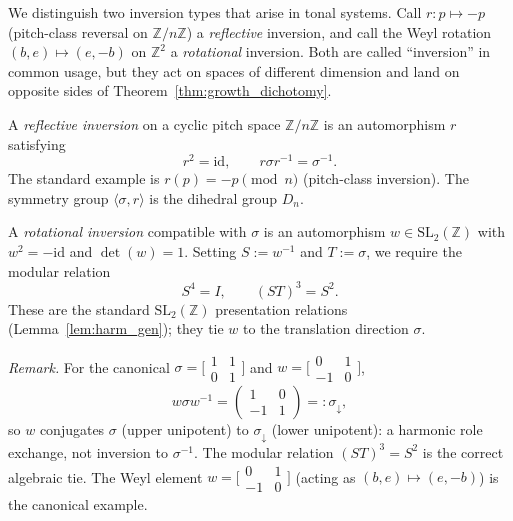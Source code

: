 We distinguish two inversion types that arise in tonal systems.
Call $r: p \mapsto -p$ (pitch-class reversal on $\mathbb{Z}/n\mathbb{Z}$) a
\emph{reflective} inversion, and call the Weyl rotation
$(b,e) \mapsto (e,-b)$ on $\mathbb{Z}^2$ a \emph{rotational} inversion.
Both are called ``inversion'' in common usage, but they act on spaces of
different dimension and land on opposite sides of
Theorem~\ref{thm:growth_dichotomy}.

\begin{definition}
  \label{def:refl_inv}
  A \emph{reflective inversion} on a cyclic pitch space $\mathbb{Z}/n\mathbb{Z}$
  is an automorphism $r$ satisfying
  \[
    r^2 = \mathrm{id}, \qquad r\sigma r^{-1} = \sigma^{-1}.
  \]
  The standard example is $r(p) = -p \pmod{n}$ (pitch-class inversion).
  The symmetry group $\langle \sigma, r \rangle$ is the dihedral group $D_n$.
\end{definition}

\begin{definition}
  \label{def:rot_inv}
  A \emph{rotational inversion} compatible with $\sigma$ is an automorphism
  $w \in \mathrm{SL}_2(\mathbb{Z})$ with $w^2 = -\mathrm{id}$ and $\det(w) = 1$.
  Setting $S := w^{-1}$ and $T := \sigma$, we require the modular relation
  \[
    S^4 = I, \qquad (ST)^3 = S^2.
  \]
  These are the standard $\mathrm{SL}_2(\mathbb{Z})$ presentation relations
  (Lemma~\ref{lem:harm_gen}); they tie $w$ to the translation direction $\sigma$.

  \emph{Remark.}  For the canonical $\sigma =
  \bigl[\begin{smallmatrix}1&1\\0&1\end{smallmatrix}\bigr]$ and
  $w = \bigl[\begin{smallmatrix}0&1\\-1&0\end{smallmatrix}\bigr]$,
  \[
    w\sigma w^{-1} = \begin{pmatrix}1&0\\-1&1\end{pmatrix} =: \sigma_{\downarrow},
  \]
  so $w$ conjugates $\sigma$ (upper unipotent) to $\sigma_{\downarrow}$ (lower
  unipotent): a harmonic role exchange, not inversion to $\sigma^{-1}$.
  The modular relation $(ST)^3 = S^2$ is the correct algebraic tie.
  The Weyl element $w = \bigl[\begin{smallmatrix}0&1\\-1&0\end{smallmatrix}\bigr]$
  (acting as $(b,e) \mapsto (e,-b)$) is the canonical example.
\end{definition}

